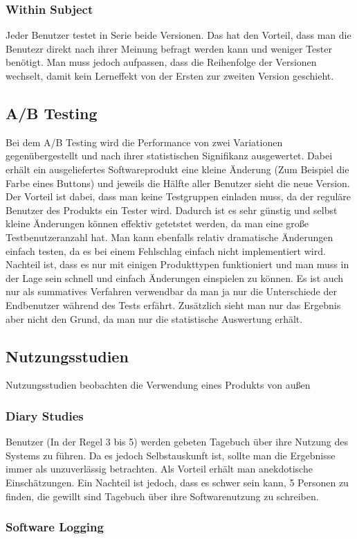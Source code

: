 \documentclass{article}
\begin{document}
	\subsubsection{Within Subject}
	Jeder Benutzer testet in Serie beide Versionen. Das hat den Vorteil, dass man die Benutezr direkt nach ihrer Meinung befragt werden kann und weniger Tester benötigt. Man muss jedoch aufpassen, dass die Reihenfolge der Versionen wechselt, damit kein Lerneffekt von der Ersten zur zweiten Version geschieht.
	\subsection{A/B Testing}
	Bei dem A/B Testing wird die Performance von zwei Variationen gegenübergestellt und nach ihrer statistischen Signifikanz ausgewertet. Dabei erhält ein ausgeliefertes Softwareprodukt eine kleine Änderung (Zum Beispiel die Farbe eines Buttons) und jeweils die Hälfte aller Benutzer sieht die neue Version. Der Vorteil ist dabei, dass man keine Testgruppen einladen muss, da der reguläre Benutzer des Produkts ein Tester wird. Dadurch ist es sehr günstig und selbst kleine Änderungen können effektiv getetstet werden, da man eine große Testbenutzeranzahl hat. Man kann ebenfalls relativ dramatische Änderungen einfach testen, da es bei einem Fehlschlag einfach nicht implementiert wird. Nachteil ist, dass es nur mit einigen Produkttypen funktioniert und man muss in der Lage sein schnell und einfach Änderungen einspielen zu können. Es ist auch nur als summatives Verfahren verwendbar da man ja nur die Unterschiede der Endbenutzer während des Tests erfährt. Zusätzlich sieht man nur das Ergebnis aber nicht den Grund, da man nur die statistische Auswertung erhält.
	\subsection{Nutzungsstudien}
	Nutzungsstudien beobachten die Verwendung eines Produkts von außen
	\subsubsection{Diary Studies}
	Benutzer (In der Regel 3 bis 5) werden gebeten Tagebuch über ihre Nutzung des Systems zu führen. Da es jedoch Selbstauskunft ist, sollte man die Ergebnisse immer als unzuverlässig betrachten. Als Vorteil erhält man anekdotische Einschätzungen. Ein Nachteil ist jedoch, dass es schwer sein kann, 5 Personen zu finden, die gewillt sind Tagebuch über ihre Softwarenutzung zu schreiben.
	\subsubsection{Software Logging}
\end{document}
